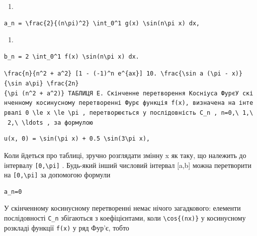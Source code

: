 \documentclass[
  ukrainian,
]{article}
\providecommand{\tightlist}{%
  \setlength{\itemsep}{0pt}\setlength{\parskip}{0pt}}
\begin{document}
\begin{enumerate}
\def\labelenumi{\arabic{enumi}.}
\tightlist
\item
\end{enumerate}

\begin{verbatim}
a_n = \frac{2}{(n\pi)^2} \int_0^1 g(x) \sin(n\pi x) dx,
\end{verbatim}

\begin{enumerate}
\def\labelenumi{\arabic{enumi}.}
\setcounter{enumi}{8}
\tightlist
\item
\end{enumerate}

\begin{verbatim}
b_n = 2 \int_0^1 f(x) \sin(n\pi x) dx.
\end{verbatim}

\texttt{\textquotesingle{}\textbackslash{}frac\{n\}\{n\^{}2\ +\ a\^{}2\}\ {[}1\ -\ (-1)\^{}n\ e\^{}\{ax\}{]}\textquotesingle{}\ 10.\ \textquotesingle{}\textbackslash{}frac\{\textbackslash{}sin\ a\ (\textbackslash{}pi\ -\ x)\}\{\textbackslash{}sin\ a\textbackslash{}pi\}\textquotesingle{}\ \textquotesingle{}\textbackslash{}frac\{2n\}\{\textbackslash{}pi\ (n\^{}2\ +\ a\^{}2)\}\textquotesingle{}\ ТАБЛИЦЯ\ E.\ Скінченне\ перетворення\ Косніуса\ Фур\textquotesingle{}єУ\ скінченному\ косинусному\ перетворенні\ Фур\textquotesingle{}є\ функція\ \textquotesingle{}f(x)\textquotesingle{},\ визначена\ на\ інтервалі\ \textquotesingle{}0\ \textbackslash{}le\ x\ \textbackslash{}le\ \textbackslash{}pi\textquotesingle{}\ ,\ перетворюється\ у\ послідовність\ \textquotesingle{}C\_n\textquotesingle{}\ ,\ \textquotesingle{}n=0,\textbackslash{}\ 1,\textbackslash{}\ 2,\textbackslash{}\ \textbackslash{}ldots\textquotesingle{}\ ,\ за\ формулою}

\begin{verbatim}
u(x, 0) = \sin(\pi x) + 0.5 \sin(3\pi x),
\end{verbatim}

Коли йдеться про таблиці, зручно розглядати змінну x як таку, що
належить до інтервалу \texttt{{[}0,\textbackslash{}pi{]}} . Будь-який
інший числовий інтервал {[}a,b{]} можна перетворити на
\texttt{{[}0,\textbackslash{}pi{]}} за допомогою формули

\begin{verbatim}
a_n=0
\end{verbatim}

У скінченному косинусному перетворенні немає нічого загадкового:
елементи послідовності \texttt{C\_n} збігаються з коефіцієнтами, коли
\texttt{\textbackslash{}cos\{(nx)\}} у косинусному розкладі функції
\texttt{f(x)} у ряд Фур'є, тобто
\end{document}
